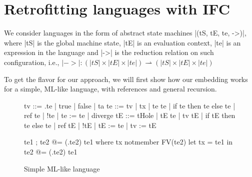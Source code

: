 \section{Retrofitting languages with IFC}
\label{sec:retrofit}


We consider languages in the form of abstract state machines |(tS, tE,
te, ->)|, where |tS| is the global machine state, |tE| is an evaluation
context, |te| is an expression in the language and |->| is the
reduction relation on such configuration, i.e., $|->| : (|tS| \times
|tE| \times |te|) \rightharpoonup (|tS| \times |tE| \times |te|)$


To get the flavor for our approach, we will first show how our embedding
works for a simple, ML-like language, with references and general recursion.

\begin{figure}
\begin{code}
tv   ::= \tx.te | true | false | ta
te   ::= tv | tx | te te | if te then te else te | ref te | !te | te := te | diverge
tE   ::= tHole | tE te | tv tE | if tE then te else te
       | ref tE | !tE | tE := te | tv := tE 

te1 ; te2            @= (\tx.te2) te1  where  tx notmember FV(te2)
let tx = te1 in te2  @= (\tx.te2) te1
\end{code}


\caption{Simple ML-like language}
\label{fig:ml}
\end{figure}

